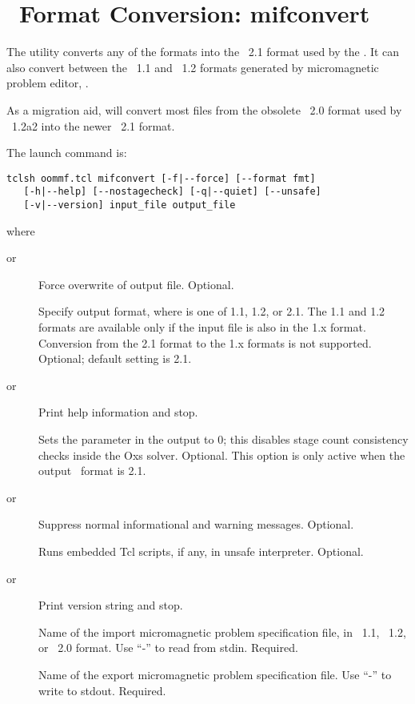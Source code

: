 \section{\MIF\ Format Conversion: mifconvert}\label{sec:mifconvert}%

The  utility converts any
of the
 formats into the
\MIF~2.1 format used by the
.
It can also convert between
the  \MIF~1.1 and \MIF~1.2
formats generated by micromagnetic problem editor,
.

As a migration aid,  will convert most files from the
obsolete \MIF~2.0 format used by \OOMMF\ 1.2a2 into the newer
\MIF~2.1 format.

The  launch command is:
\begin{verbatim}
tclsh oommf.tcl mifconvert [-f|--force] [--format fmt]
   [-h|--help] [--nostagecheck] [-q|--quiet] [--unsafe]
   [-v|--version] input_file output_file
\end{verbatim}
where
\begin{description}
\item[ or ]
  Force overwrite of output file.  Optional.
\item[]
  Specify output format, where  is one of 1.1, 1.2, or 2.1.  The
  1.1 and 1.2 formats are available only if the input file is also in
  the 1.x format.  Conversion from the 2.1 format to the 1.x formats is
  not supported.  Optional; default setting is 2.1.
\item[ or ]
  Print help information and stop.
\item[]
  Sets the  parameter in the output
  to 0;
 this disables stage count consistency checks inside the Oxs
 solver. Optional.
 This option is only active when the output \MIF\ format is 2.1.
\item[ or ]
  Suppress normal informational and warning messages.  Optional.
\item[]
  Runs embedded Tcl scripts, if any, in unsafe interpreter.  Optional.
\item[ or ]
  Print version string and stop.
\item[]
  Name of the import micromagnetic problem specification file, in
  \MIF~1.1, \MIF~1.2, or \MIF~2.0 format.  Use ``-'' to read from stdin.
  Required.
\item[]
  Name of the export micromagnetic problem specification file. Use ``-''
  to write to stdout.  Required.
\end{description}

